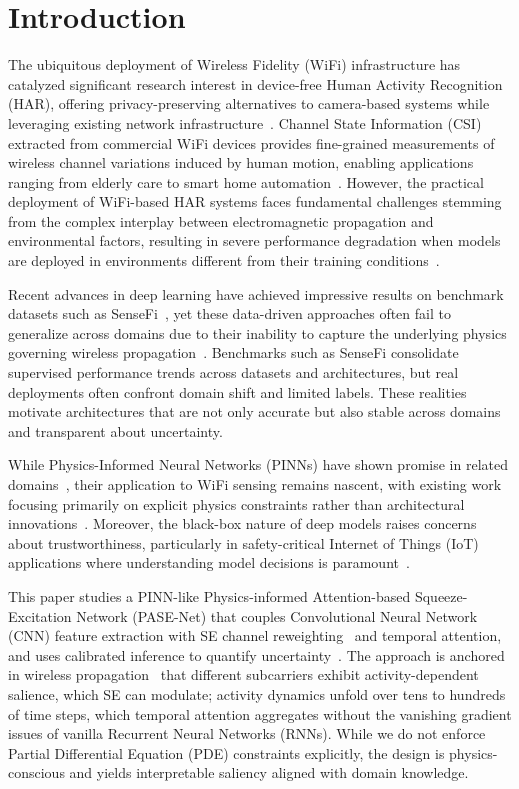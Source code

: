 \documentclass[journal]{IEEEtran}
\begin{document}
\section{Introduction}
The ubiquitous deployment of Wireless Fidelity (WiFi) infrastructure has catalyzed significant research interest in device-free Human Activity Recognition (HAR), offering privacy-preserving alternatives to camera-based systems while leveraging existing network infrastructure~\cite{liu2024wifi,wang2023privacy}. Channel State Information (CSI) extracted from commercial WiFi devices provides fine-grained measurements of wireless channel variations induced by human motion, enabling applications ranging from elderly care to smart home automation~\cite{zhang2023attention,iotj2023applications}. However, the practical deployment of WiFi-based HAR systems faces fundamental challenges stemming from the complex interplay between electromagnetic propagation and environmental factors, resulting in severe performance degradation when models are deployed in environments different from their training conditions~\cite{li2024cross,domain2023shift}.

Recent advances in deep learning have achieved impressive results on benchmark datasets such as SenseFi~\cite{yang2023sensefi}, yet these data-driven approaches often fail to generalize across domains due to their inability to capture the underlying physics governing wireless propagation~\cite{chen2022physics,pinn2023wireless}. Benchmarks such as SenseFi consolidate supervised performance trends across datasets and architectures, but real deployments often confront domain shift and limited labels. These realities motivate architectures that are not only accurate but also stable across domains and transparent about uncertainty.

While Physics-Informed Neural Networks (PINNs) have shown promise in related domains~\cite{raissi2019physics,karniadakis2021physics}, their application to WiFi sensing remains nascent, with existing work focusing primarily on explicit physics constraints rather than architectural innovations~\cite{physics2023sensing}. Moreover, the black-box nature of deep models raises concerns about trustworthiness, particularly in safety-critical Internet of Things (IoT) applications where understanding model decisions is paramount~\cite{trustworthy2023iot,calibration_guo2017}.

This paper studies a PINN-like Physics-informed Attention-based Squeeze-Excitation Network (PASE-Net) that couples Convolutional Neural Network (CNN) feature extraction with SE channel reweighting~\cite{se_networks2018} and temporal attention, and uses calibrated inference to quantify uncertainty~\cite{calibration_guo2017}. The approach is anchored in wireless propagation~\cite{goldsmith2005wireless} that different subcarriers exhibit activity-dependent salience, which SE can modulate; activity dynamics unfold over tens to hundreds of time steps, which temporal attention aggregates without the vanishing gradient issues of vanilla Recurrent Neural Networks (RNNs). While we do not enforce Partial Differential Equation (PDE) constraints explicitly, the design is physics-conscious and yields interpretable saliency aligned with domain knowledge.
\end{document}
